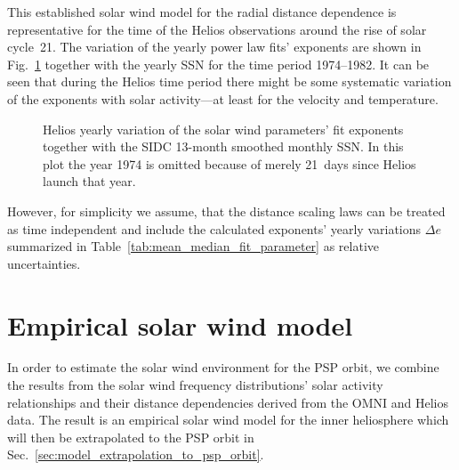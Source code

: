 This established solar wind model for the radial distance dependence is representative for the time of the Helios observations around the rise of solar cycle~21. The variation of the yearly power law fits’ exponents are shown in Fig.~\ref{fig:yearly_gradients_b} together with the yearly SSN for the time period \numrange{1974}{1982}. It can be seen that during the Helios time period there might be some systematic  variation of the exponents with solar activity---at least for the velocity and temperature.
\begin{figure}
	\caption{Helios yearly variation of the solar wind parameters' fit exponents together with the SIDC 13-month smoothed monthly SSN. In this plot the year 1974 is omitted because of merely 21~days since Helios launch that year.}
	\label{fig:yearly_gradients_b}
\end{figure}

However, for simplicity we assume, that the distance scaling laws can be treated as time independent and include the calculated exponents’ yearly variations $\Delta e$ summarized in Table~\ref{tab:mean_median_fit_parameter} as relative uncertainties.


\section{Empirical solar wind model}
\label{sec:empirical_solar_wind_model}
In order to estimate the solar wind environment for the PSP orbit, we combine the results from the solar wind frequency distributions’ solar activity relationships and their distance dependencies derived from the OMNI and Helios data. The result is an empirical solar wind model for the inner heliosphere which will then be extrapolated to the PSP orbit in Sec.~\ref{sec:model_extrapolation_to_psp_orbit}.

